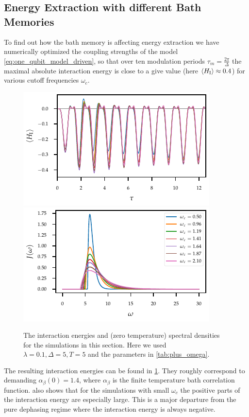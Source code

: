 \subsection{Energy Extraction with different Bath Memories}
\label{sec:extr_mem}
To find out how the bath memory is affecting energy extraction we have
numerically optimized the coupling strengths of the model
\cref{eq:one_qubit_model_driven}, so that over ten modulation periods
\(τ_{m} = \frac{2 π}{Δ}\) the maximal absolute interaction energy is
close to a give value (here \(\ev{H_{\inter}}\approx 0.4\)) for
various cutoff frequencies \(ω_{c}\).
\begin{figure}[htp]
  \centering
  \includegraphics{figs/one_bath_mod/omega_interactions}
  \includegraphics{figs/one_bath_mod/omega_sd}
  \caption{\label{fig:omega_couplings_and_energies} The interaction
    energies and (zero temperature) spectral densities for the
    simulations in this section. Here we used \(λ=0.1, Δ=5, T=5\) and
    the parameters in \cref{tab:plus_omega}.}
\end{figure}

The resulting interaction energies can be found in
\cref{fig:omega_couplings_and_energies}. They roughly correspond to
demanding \(α_{β}(0)=1.4\), where \(α_{β}\) is the finite temperature
bath correlation function.  
also shows that for the simulations with small \(ω_{c}\) the positive
parts of the interaction energy are especially large. This is a major
departure from the pure dephasing regime where the interaction energy
is always negative.

